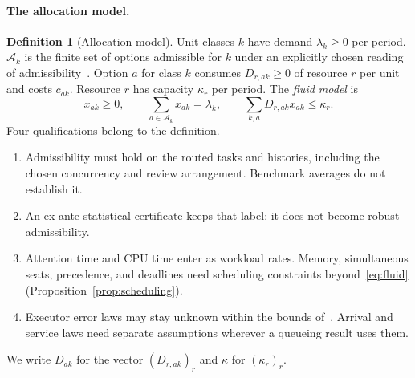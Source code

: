 \documentclass[11pt]{article}
\theoremstyle{definition}
\newtheorem{definition}[theorem]{Definition}
\theoremstyle{remark}
\begin{document}
\paragraph{The allocation model.}
\begin{definition}[Allocation model]\label{def:model}
Unit classes $k$ have demand $\lambda_k\ge0$ per period. $\mathcal A_k$ is the finite set of options
admissible for $k$ under an explicitly chosen reading of admissibility~\cite{p6}. Option $a$ for class
$k$ consumes $D_{r,ak}\ge0$ of resource $r$ per unit and costs $c_{ak}$. Resource $r$ has capacity
$\kappa_r$ per period. The \emph{fluid model} is
\begin{equation}\label{eq:fluid}\tag{F}
x_{ak}\ge0,\qquad \sum_{a\in\mathcal A_k}x_{ak}=\lambda_k,\qquad \sum_{k,a}D_{r,ak}x_{ak}\le\kappa_r .
\end{equation}
Four qualifications belong to the definition.
\begin{enumerate}[label=(\arabic*),itemsep=2pt]
\item Admissibility must hold on the routed tasks and histories, including the chosen concurrency and
review arrangement. Benchmark averages do not establish it.
\item An ex-ante statistical certificate keeps that label; it does not become robust admissibility.
\item Attention time and CPU time enter as workload rates. Memory, simultaneous seats, precedence, and
deadlines need scheduling constraints beyond~\eqref{eq:fluid} (Proposition~\ref{prop:scheduling}).
\item Executor error laws may stay unknown within the bounds of~\cite{p6}. Arrival and service laws
need separate assumptions wherever a queueing result uses them.
\end{enumerate}
\end{definition}
We write $D_{ak}$ for the vector $(D_{r,ak})_r$ and $\kappa$ for $(\kappa_r)_r$.
\end{document}

